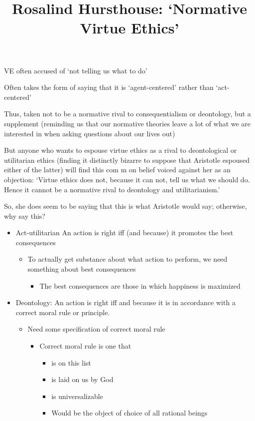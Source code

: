 \documentclass[11pt]{article}
\title{Rosalind Hursthouse: `Normative Virtue Ethics'}
\author{}
\date{}
\begin{document}
\maketitle

\noindent VE often accused of `not telling us what to do'
\vspace*{2mm}

\noindent Often takes the form of saying that it is `agent-centered' rather than `act-centered'
\vspace*{2mm}

\noindent Thus, taken not to be a normative rival to consequentialism or deontology, but a supplement (reminding us that our normative theories leave a lot of what we are interested in when asking questions about our lives out)
\vspace*{2mm}

\noindent But anyone who wants to espouse virtue ethics as a rival to deon­tological or utilitarian ethics (finding it distinctly bizarre to suppose that Aristotle espoused either of the latter) will find this com m on belief voiced against her as an objection: `Virtue ethics does not, because it can­ not, tell us what we should do. Hence it cannot be a normative rival to deontology and utilitarianism.'
\vspace*{2mm}

\noindent So, she does seem to be saying that this is what Aristotle would say; otherwise, why say this?

\begin{itemize}\item{Act-utilitarian An action is right iff (and because) it promotes the best consequences}\begin{itemize}\item{To actually get substance about what action to perform, we need something about best consequences}\begin{itemize}\item{The best consequences are those in which hap­piness is maximized}\end{itemize}\end{itemize}\item{Deontology: An action is right iff and because it is in accordance with a correct moral rule or principle.}\begin{itemize}\item{Need some specification of correct moral rule}\begin{itemize}\item{Correct moral rule is one that}\begin{itemize}\item{is on this list}\item{is laid on us by God}\item{is universalizable}\item{Would be the object of choice of all rational beings}\end{itemize}\end{itemize}\end{itemize}\end{itemize}
\end{document}
